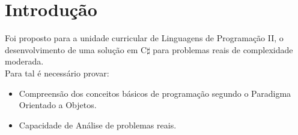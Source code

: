 \chapter{Introdução}
Foi proposto para a unidade curricular de Linguagens de Programação II, o desenvolvimento de uma solução em C$\sharp$ para problemas reais de complexidade moderada.\\
Para tal é necessário provar:
\begin{itemize}
	\item Compreensão dos conceitos básicos de programação segundo o Paradigma Orientado a Objetos.
	\item Capacidade de Análise de problemas reais.
\end{itemize}
